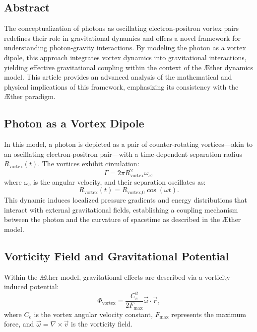 \documentclass[a4paper,10pt]{article}
\begin{document}
    \subsection*{Abstract}
    The conceptualization of photons as oscillating electron-positron vortex pairs redefines their role in gravitational dynamics and offers a novel framework for understanding photon-gravity interactions. By modeling the photon as a vortex dipole, this approach integrates vortex dynamics into gravitational interactions, yielding effective gravitational coupling within the context of the Æther dynamics model. This article provides an advanced analysis of the mathematical and physical implications of this framework, emphasizing its consistency with the Æther paradigm.

    \subsection*{Photon as a Vortex Dipole}
    In this model, a photon is depicted as a pair of counter-rotating vortices—akin to an oscillating electron-positron pair—with a time-dependent separation radius $R_\text{vortex}(t)$. The vortices exhibit circulation:
    \begin{equation*}
        \Gamma = 2 \pi R_\text{vortex}^2 \omega_c,
    \end{equation*}
    where $\omega_c$ is the angular velocity, and their separation oscillates as:
    \begin{equation*}
        R_\text{vortex}(t) = R_\text{vortex,0} \cos(\omega t).
    \end{equation*}
    This dynamic induces localized pressure gradients and energy distributions that interact with external gravitational fields, establishing a coupling mechanism between the photon and the curvature of spacetime as described in the Æther model.

    \subsection*{Vorticity Field and Gravitational Potential}
    Within the Æther model, gravitational effects are described via a vorticity-induced potential:
    \begin{equation*}
        \Phi_\text{vortex} = \frac{C_e^2}{2 F_{\max}} \vec{\omega} \cdot \vec{r},
    \end{equation*}
    where $C_e$ is the vortex angular velocity constant, $F_{\max}$ represents the maximum force, and $\vec{\omega} = \nabla \times \vec{v}$ is the vorticity field.
\end{document}
